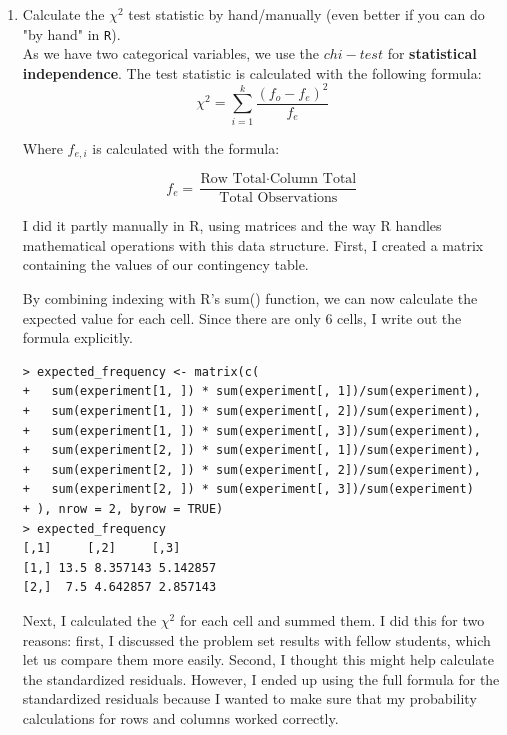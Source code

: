 \documentclass[12pt,letterpaper]{article}
\begin{document}
\begin{enumerate}
	
	\item [(a)]
	Calculate the $\chi^2$ test statistic by hand/manually (even better if you can do "by hand" in \texttt{R}).\\
	
	
	As we have two categorical variables, we use the $chi-test$ for \textbf{statistical independence}. The test statistic is calculated with the following formula:  $$\chi^2 = \sum_{i=1}^{k} \frac{(f_{o} - f_{e})^2}{f_{e}}$$
	
	Where $f_{e,i}$ is calculated with the formula:
	
	\begin{equation}
		f_{e} = \frac{\text{Row Total} \cdot \text{Column Total}}{\text{Total Observations}}
	\end{equation}
	
	I did it partly manually in R, using matrices and the way R handles mathematical operations with this data structure. First, I created a matrix containing the values of our contingency table. 
	
	
	
	By combining indexing with R's sum() function, we can now calculate the expected value for each cell. Since there are only 6 cells, I write out the formula explicitly.  
	
	\begin{verbatim}
> expected_frequency <- matrix(c(
+   sum(experiment[1, ]) * sum(experiment[, 1])/sum(experiment),
+   sum(experiment[1, ]) * sum(experiment[, 2])/sum(experiment),
+   sum(experiment[1, ]) * sum(experiment[, 3])/sum(experiment),
+   sum(experiment[2, ]) * sum(experiment[, 1])/sum(experiment),
+   sum(experiment[2, ]) * sum(experiment[, 2])/sum(experiment),
+   sum(experiment[2, ]) * sum(experiment[, 3])/sum(experiment)
+ ), nrow = 2, byrow = TRUE)
> expected_frequency
[,1]     [,2]     [,3]
[1,] 13.5 8.357143 5.142857
[2,]  7.5 4.642857 2.857143
	\end{verbatim}

Next, I calculated the $\chi^2$ for each cell and summed them. I did this for two reasons: first, I discussed the problem set results with fellow students, which let us compare them more easily. Second, I thought this might help calculate the standardized residuals. However, I ended up using the full formula for the standardized residuals because I wanted to make sure that my probability calculations for rows and columns worked correctly.


\end{enumerate}
\end{document}
